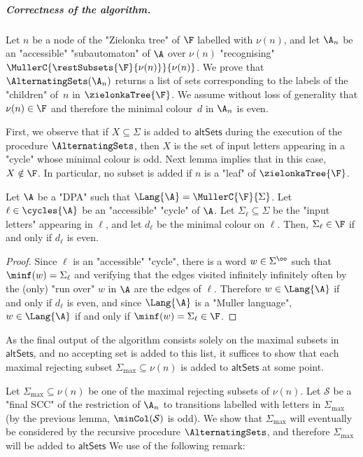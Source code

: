 \documentclass[10pt,a4paper]{amsart}
\renewcommand{\S}{\mathcal{S}}
\renewcommand{\SS}{\Sigma}
\begin{document}
\subparagraph*{Correctness of the algorithm.}
Let $n$ be a node of the "Zielonka tree" of $\F$ labelled with $\nu(n)$, and let $\A_n$ be an "accessible" "subautomaton" of $\A$ over $\nu(n)$ "recognising" $\MullerC{\restSubsets{\F}{\nu(n)}}{\nu(n)}$.
We prove that $\AlternatingSets(\A_n)$ returns a list of sets corresponding to the labels of the "children" of~$n$ in $\zielonkaTree{\F}$. We assume without loss of generality that $\nu(n)\in \F$ and therefore the minimal colour~$d$ in $\A_n$ is even.


First, we observe that if $X\subseteq \SS$ is added to $\mathsf{altSets}$ during the execution of the procedure $\AlternatingSets$, then $X$ is the set of input letters appearing in a "cycle" whose minimal colour is odd.
Next lemma implies that in this case, $X\notin \F$.
In particular, no subset is added if $n$ is a "leaf" of $\zielonkaTree{\F}$.

\begin{lemma}\label{lemma-minm:SCC-determines-acceptance}
	Let $\A$ be a "DPA" such that $\Lang{\A} = \MullerC{\F}{\SS}$.
	Let $\ell\in \cycles{\A}$ be an "accessible" "cycle" of $\A$. Let $\SS_\ell\subseteq \SS$ be the "input letters" appearing in $\ell$, and let $d_\ell$ be the minimal colour on $\ell$. Then, $\SS_\ell \in \F$ if and only if $d_\ell$ is even. 
\end{lemma}
\begin{proof}
	Since $\ell$ is an "accessible" "cycle", there is a word $w\in \SS^\oo$ such that $\minf(w) = \SS_\ell$ and verifying that the edges visited infinitely infinitely often by the (only) "run over" $w$ in $\A$ are the edges of $\ell$. Therefore $w\in \Lang{\A}$ if and only if $d_\ell$ is even, and since $\Lang{\A}$ is a "Muller language", $w\in \Lang{\A}$ if and only if $\minf(w) = \SS_\ell \in \F$.
\end{proof}

As the final output of the algorithm consists solely on the maximal subsets in $\mathsf{altSets}$, and no accepting set is added to this list, it suffices to show that each maximal rejecting subset $\SS_{\max}\subseteq \nu(n)$ is added to $\mathsf{altSets}$ at some point.

Let $\SS_{\max}\subseteq \nu(n)$ be one of the maximal rejecting subsets of $\nu(n)$. Let $\S$ be a "final SCC" of the restriction of $\A_n$ to transitions labelled with letters in $\SS_{\max}$ (by the previous lemma, $\minCol(\S)$ is odd).  We show that $\SS_{\max}$ will eventually be considered by the recursive procedure $\AlternatingSets$, and therefore $\SS_{\max}$ will be added to $\mathsf{altSets}$ 
We use of the following remark:
\end{document}
